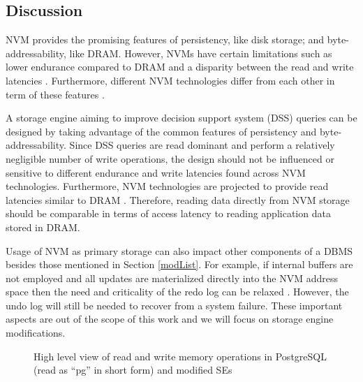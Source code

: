 \subsection{Discussion}
NVM provides the promising features of persistency, like disk storage; and byte-addressability, like DRAM. However, NVMs
have certain limitations such as lower endurance compared to DRAM \cite{arulraj2015let} and a disparity between the read and write latencies \cite{pelley2014memory}. 
Furthermore, different NVM technologies differ from each other in term of these features \cite{arulraj2015let}.

 
A storage engine aiming to improve decision support
system (DSS) queries can be designed by taking advantage
of the common features of persistency and byte-addressability.
Since DSS queries are read dominant and perform a relatively
negligible number of write operations, the design should
not be influenced or sensitive to different endurance and write
latencies found across NVM technologies. Furthermore, NVM technologies
are projected to provide read latencies similar to DRAM \cite{mittal2016survey,arulraj2015let,wang2013low,chang2012limits}.
Therefore, reading data directly from NVM storage should be comparable in terms
of access latency to reading application data stored in DRAM.

 
Usage of NVM as primary storage can also impact
other components of a DBMS besides those mentioned
in Section \ref{modList}. For example, if internal buffers are not
employed and all updates are materialized directly into the
NVM address space then the need and criticality of the redo
log can be relaxed \cite{huang2014nvram}. However, the undo log will still be
needed to recover from a system failure. These important aspects are
out of the scope of this work and we will focus on storage engine modifications.

\begin{figure*}  [!htbp]
\centering     %
{}
\caption{High level view of read and write memory operations in PostgreSQL (read as ``pg'' in short form) and modified SEs}
\label{Fig3}
\end{figure*}
 

